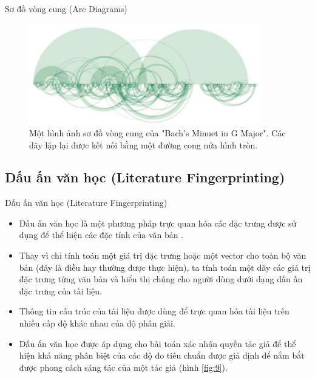 \documentclass[10pt]{beamer}
\theoremstyle{remark}
\theoremstyle{definition}
\begin{document}
\begin{frame}{Sơ đồ vòng cung (Arc Diagrams)}
	\begin{figure}[h!]
        \centering
        \includegraphics[width=0.9\textwidth]{8.png}
        \caption{Một hình ảnh sơ đồ vòng cung của "Bach’s Minuet in G Major".
        Các dãy lặp lại được kết nối bằng một đường cong nửa hình tròn. \cite{451}}
        \label{fig:8}
    \end{figure}
\end{frame}

\subsection{Dấu ấn văn học (Literature Fingerprinting)}

\begin{frame}{Dấu ấn văn học (Literature Fingerprinting)}
	\begin{itemize}
		\item Dấu ấn văn học là một phương pháp trực quan hóa các đặc trưng được sử dụng để thể hiện các đặc tính của văn bản \cite{222}.
		\item Thay vì chỉ tính toán một giá trị đặc trưng hoặc một vector cho toàn bộ văn bản (đây là điều hay thường được thực hiện), ta tính toán một dãy các giá trị đặc trưng từng văn bản và hiển thị chúng cho người dùng dưới dạng dấu ấn đặc trưng của tài liệu.
		\item Thông tin cấu trúc của tài liệu được dùng để trực quan hóa tài liệu trên nhiều cấp độ khác nhau của độ phân giải.
		\item Dấu ấn văn học được áp dụng cho bài toán xác nhận quyền tác giả để thể hiện khả năng phân biệt của các độ đo tiêu chuẩn được giả định để nắm bắt được phong cách sáng tác của một tác giả (hình \ref{fig:9}).
	\end{itemize}
\end{frame}
\end{document}
